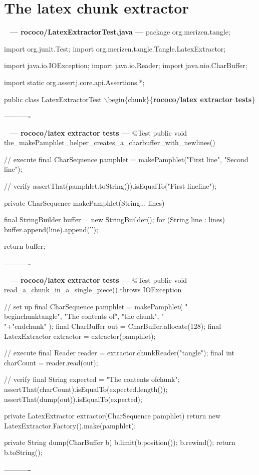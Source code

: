 \documentclass{book}
\newenvironment{chunk}[1]{%
{\ }\newline\noindent%
\hbox{\hskip 2.0cm}{\bf --- #1 ---}%
\verbatim}%                               say exactly what we see
{\endverbatim%
\par{}%
\noindent{}%
\hbox{\hskip 2.0cm}{\bf ----------}%
\par%
\normalsize\noindent}%
\providecommand{\getchunk}[1]{%
\noindent%
{\small $\backslash{}$begin\{chunk\}\{{\bf #1}\}}%
\index{{#1}}}
\begin{document}
\section{The latex chunk extractor}
\begin{chunk}{rococo/LatexExtractorTest.java}
package org.merizen.tangle;

import org.junit.Test;
import org.merizen.tangle.Tangle.LatexExtractor;

import java.io.IOException;
import java.io.Reader;
import java.nio.CharBuffer;

import static org.assertj.core.api.Assertions.*;

public class LatexExtractorTest {
\getchunk{rococo/latex extractor tests}
}
\end{chunk}

\begin{chunk}{rococo/latex extractor tests}
@Test
public void the_makePamphlet_helper_creates_a_charbuffer_with_newlines() {
    // execute
    final CharSequence pamphlet = makePamphlet("First line", "Second line");

    // verify
    assertThat(pamphlet.toString()).isEqualTo("First line\nSecond line\n");
}

private CharSequence makePamphlet(String... lines) {
    final StringBuilder buffer = new StringBuilder();
    for (String line : lines) {
        buffer.append(line).append('\n');
    }

    return buffer;
}
\end{chunk}

\begin{chunk}{rococo/latex extractor tests}
@Test
public void read_a_chunk_in_a_single_piece() throws IOException {
    // set up
    final CharSequence pamphlet = makePamphlet(
            "\\begin{chunk}{tangle}",
            "The contents of",
            "the chunk",
            "\\"+"end{chunk}"
    );
    final CharBuffer out = CharBuffer.allocate(128);
    final LatexExtractor extractor = extractor(pamphlet);

    // execute
    final Reader reader = extractor.chunkReader("tangle");
    final int charCount = reader.read(out);

    // verify
    final String expected = "The contents of\nthe chunk\n";
    assertThat(charCount).isEqualTo(expected.length());
    assertThat(dump(out)).isEqualTo(expected);
}

private LatexExtractor extractor(CharSequence pamphlet) {
    return new LatexExtractor.Factory().make(pamphlet);
}

private String dump(CharBuffer b) {
    b.limit(b.position());
    b.rewind();
    return b.toString();
}
\end{chunk}
\end{document}

